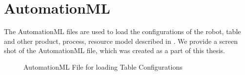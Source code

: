 \section{AutomationML}
The AutomationML files are used to load the configurations of the robot, table and other product, process, resource model described in \citet{DiazP2016}. We provide a screen shot of the AutomationML file, which was created as a part of this thesis.
\begin{figure}[!htbp] %
	\centering
	\caption{AutomationML File for loading Table Configurations}  
	\label{app:img1}
\end{figure}